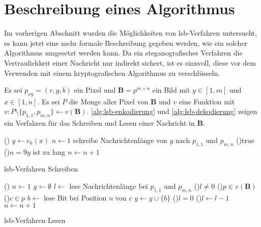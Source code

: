 \section{Beschreibung eines Algorithmus}
Im vorherigen Abschnitt wurden die Möglichkeiten von \acs{lsb}-Verfahren untersucht,
es kann jetzt eine mehr formale Beschreibung gegeben werden,
wie ein solcher Algorithmus umgesetzt werden kann.
Da ein steganografisches Verfahren die Vertraulichkeit einer Nachricht
nur indirekt sichert, ist es sinnvoll, diese vor dem Verwenden mit einem
kryptografischen Algorithmus zu verschlüsseln.

\begin{definition}
  Es sei $p_{xy} = (r,g,b)$ ein Pixel und $\mathbf{B} = p^{m \times n}$ ein Bild
  mit $y \in [1, m]$ und $x \in [1, n]$. Es sei $P$ die Menge aller Pixel von $\mathbf{B}$
  und $v$ eine Funktion mit $v: P \setminus \{p_{1,1},p_{m,n}\} \leftarrow v(\mathbf{B})$.
  \autoref{alg:lsb-enkodierung} und \ref{alg:lsb-dekodierung} zeigen ein Verfahren für das
  Schreiben und Lesen einer Nachricht in $\mathbf{B}$.

  \begin{singlespace}
    \begin{algorithm}
      \DontPrintSemicolon
      \Begin(){
        $y \leftarrow e_k(x)$\;
        $n \leftarrow 1$\;
        schreibe Nachrichtenlänge von $y$ nach $p_{1,1}$ und $p_{m,n}$\;
        \While(){true}{
          \lIf(){$n = 9$}{$y$ ist zu lang}
          $n \leftarrow n + 1$\;
        }
      }
      \caption{\acs{lsb}-Verfahren Schreiben}
      \label{alg:lsb-enkodierung}
    \end{algorithm}
  \end{singlespace}

  \begin{singlespace}
    \begin{algorithm}[H]
      \DontPrintSemicolon
      \Begin(){
        $n \leftarrow 1$\;
        $y \leftarrow \emptyset$\;
        $l \leftarrow$ lese Nachrichtenlänge bei $p_{1,1}$ und $p_{m,n}$\;
        \While(){$l \neq 0$}{
          \For(){$p \in v(\mathbf{B})$}{
            \For(){$c \in p$}{
              $b \leftarrow$ lese Bit bei Position $n$ von $c$\;
              $y \leftarrow y \cup \{b\}$\;
              \lIf(){$l = 0$} {
              }
              \lElse(){$l \leftarrow l - 1$}
            }
          }
          $n \leftarrow n + 1$\;
        }
      }
      \caption{\acs{lsb}-Verfahren Lesen}
      \label{alg:lsb-dekodierung}
    \end{algorithm}
  \end{singlespace}
\end{definition}

